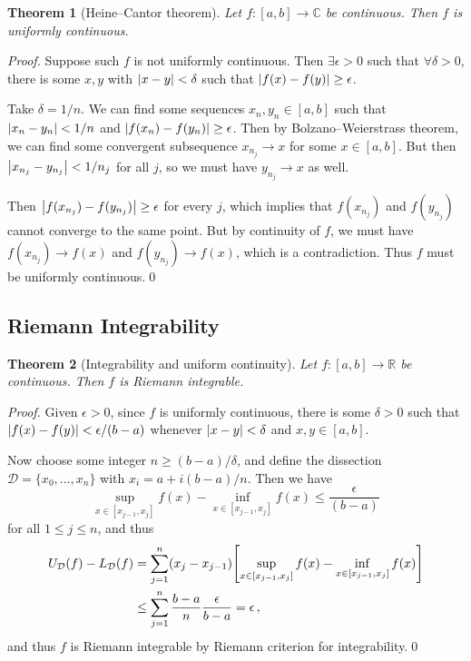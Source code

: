 \documentclass{article}
\theoremstyle{plain}\theoremheaderfont{\normalfont\itshape}\theorembodyfont{\rmfamily}\theoremseparator{.}\newtheorem*{rem}{Remark}\newtheorem*{ex}{Example}\newtheorem*{proof}{Proof}\newtheorem*{altp}{Alternative proof}
\theoremstyle{plain}\theoremheaderfont{\normalfont\bfseries}\theorembodyfont{\rmfamily}\theoremseparator{.}\newtheorem{thm}{Theorem}[section]\newtheorem{lem}[thm]{Lemma}\newtheorem{prop}[thm]{Proposition}\newtheorem*{cor}{Corollary}\newtheorem{defn}[thm]{Definition}\newtheorem{clm}[thm]{Claim}\newtheorem{clminproof}{Claim}
\theoremstyle{break}\theoremheaderfont{\normalfont\itshape}\theorembodyfont{\rmfamily}\theoremseparator{.\medskip}\newtheorem*{proofskip}{Proof}\newtheorem*{exs}{Examples}\newtheorem*{rems}{Remarks}
\theoremstyle{break}\theoremheaderfont{\normalfont\bfseries}\theorembodyfont{\rmfamily}\theoremseparator{.\medskip}\newtheorem{lemskip}[thm]{Lemma}\newtheorem{defnskip}[thm]{Definition}\newtheorem{propskip}[thm]{Proposition}\newtheorem{thmskip}[thm]{Theorem}
\newcommand{\qed}{\hfill\ensuremath{\Box}}
\begin{document}
    \begin{thm}[Heine--Cantor theorem]
        Let \(f:[a,b]\to\mathbb{C}\) be continuous. Then \(f\) is uniformly continuous.
    \end{thm}
    \begin{proof}
        Suppose such \(f\) is not uniformly continuous. Then \(\exists \epsilon>0\) such that \(\forall \delta>0\), there is some \(x,y\) with \(\abs{x-y}<\delta\) such that \(\abs{f(x)-f(y)}\ge\epsilon\).

        Take \(\delta=1/n\). We can find some sequences \(x_n,y_n\in[a,b]\) such that \(\abs{x_n-y_n}<1/n\) and \(\abs{f(x_n)-f(y_n)}\ge\epsilon\). Then by Bolzano--Weierstrass theorem, we can find some convergent subsequence \(x_{n_j}\to x\) for some \(x\in[a,b]\). But then \(\abs{x_{n_j}-y_{n_j}}<1/n_j\) for all \(j\), so we must have \(y_{n_j}\to x\) as well.

        Then \(\abs{f(x_{n_j})-f(y_{n_j})}\ge\epsilon\) for every \(j\), which implies that \(f(x_{n_j})\) and \(f(y_{n_j})\) cannot converge to the same point. But by continuity of \(f\), we must have \(f(x_{n_j})\to f(x)\) and \(f(y_{n_j})\to f(x)\), which is a contradiction. Thus \(f\) must be uniformly continuous.\qed
    \end{proof}
    \subsection{Riemann Integrability}
    \begin{thm}[Integrability and uniform continuity]
        Let \(f:[a,b]\to\mathbb{R}\) be continuous. Then \(f\) is Riemann integrable.
    \end{thm}
    \begin{proof}
        Given \(\epsilon>0\), since \(f\) is uniformly continuous, there is some \(\delta>0\) such that \(\abs{f(x)-f(y)}<\epsilon/(b-a)\) whenever \(\abs{x-y}<\delta\) and \(x,y\in[a,b]\).

        Now choose some integer \(n\ge(b-a)/\delta\), and define the dissection \(\mathcal{D}=\{x_0,\dots,x_n\}\) with \(x_i=a+i(b-a)/n\). Then we have
        \[\sup_{x\in[x_{j-1},x_j]}f(x)-\inf_{x\in[x_{j-1},x_j]}f(x)\le\frac{\epsilon}{(b-a)}\]
        for all \(1\le j\le n\), and thus
        \begin{align*}
            U_{\mathcal{D}}(f)-L_{\mathcal{D}}(f)&=\sum_{j=1}^{n}(x_j-x_{j-1})\qty[\sup_{x\in[x_{j-1},x_j]}f(x)-\inf_{x\in[x_{j-1},x_j]}f(x)]\\
            &\le\sum_{j=1}^{n}\frac{b-a}{n}\frac{\epsilon}{b-a}=\epsilon\,,
        \end{align*}
        and thus \(f\) is Riemann integrable by Riemann criterion for integrability.\qed
    \end{proof}
\end{document}
